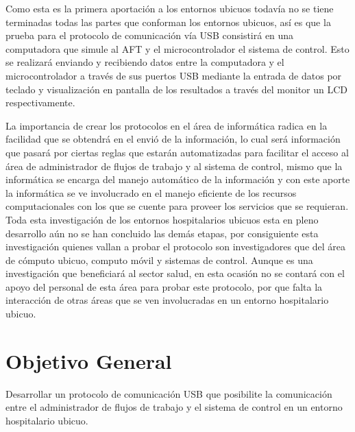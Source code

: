 \vspace{0.2cm}

Como esta es la primera aportación a los entornos ubicuos todavía
no se tiene terminadas todas las partes que conforman los entornos
ubicuos, así es que la prueba para el protocolo de comunicación
vía USB consistirá en una computadora que simule al AFT y el
microcontrolador el sistema de control. Esto se realizará enviando
y recibiendo datos entre la computadora y el microcontrolador a
través de sus puertos USB mediante la entrada de datos por teclado
y visualización en pantalla de los resultados a través del monitor
un LCD respectivamente.\\

\vspace{0.2cm}

La importancia de crear los protocolos en el área de informática
radica en la facilidad que se obtendrá en el envió de la
información, lo cual será información que pasará por ciertas
reglas que estarán automatizadas para facilitar el acceso al área
de administrador de flujos de trabajo y al sistema de control,
mismo que la informática se encarga del manejo automático de la
información y con este aporte la informática se ve involucrado en
el manejo eficiente de los recursos computacionales con los que se
cuente para proveer los servicios que se requieran. Toda esta
investigación de los entornos hospitalarios ubicuos esta en pleno
desarrollo aún no se han concluido las demás etapas, por
consiguiente esta investigación quienes vallan a probar el
protocolo son investigadores que del área de cómputo ubicuo,
computo móvil y sistemas de control. Aunque es una investigación
que beneficiará al sector salud, en esta ocasión no se contará con
el apoyo del personal de esta área para probar este protocolo, por
que falta la interacción de otras áreas que se ven involucradas en
un entorno hospitalario ubicuo.\\

\vspace{0.2cm}

\newpage
\section{Objetivo General}

Desarrollar un protocolo de comunicación USB que posibilite la
comunicación entre el administrador de flujos de trabajo y el
sistema de control en un entorno hospitalario ubicuo.\\


